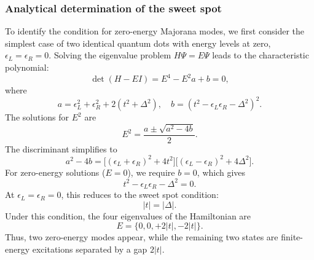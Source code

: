 \documentclass[11pt, letterpaper, titlepage]{article}
\begin{document}

\subsubsection{Analytical determination of the sweet spot}
To identify the condition for zero-energy Majorana modes, we first consider the simplest case of two identical quantum dots with energy levels at zero, \(\epsilon_L = \epsilon_R = 0\). Solving the eigenvalue problem \(H \Psi = E \Psi\) leads to the characteristic polynomial:
\[
\det(H - E I) = E^4 - E^2 a + b = 0,
\]
where
\[
a = \epsilon_L^2 + \epsilon_R^2 + 2(t^2 + \Delta^2), \quad
b = (t^2 - \epsilon_L \epsilon_R - \Delta^2)^2.
\]
The solutions for \(E^2\) are
\[
E^2 = \frac{a \pm \sqrt{a^2 - 4b}}{2}.
\]
The discriminant simplifies to 
\[
a^2 - 4b = \big[(\epsilon_L + \epsilon_R)^2 + 4t^2\big] \big[(\epsilon_L - \epsilon_R)^2 + 4\Delta^2\big].
\]
For zero-energy solutions (\(E = 0\)), we require \(b = 0\), which gives
\[
t^2 - \epsilon_L \epsilon_R - \Delta^2 = 0.
\]
At \(\epsilon_L = \epsilon_R = 0\), this reduces to the sweet spot condition:
\[
|t| = |\Delta|.
\]
Under this condition, the four eigenvalues of the Hamiltonian are
\[
E = \{0, 0, +2|t|, -2|t|\}.
\]
Thus, two zero-energy modes appear, while the remaining two states are finite-energy excitations separated by a gap \(2|t|\).
\end{document}
